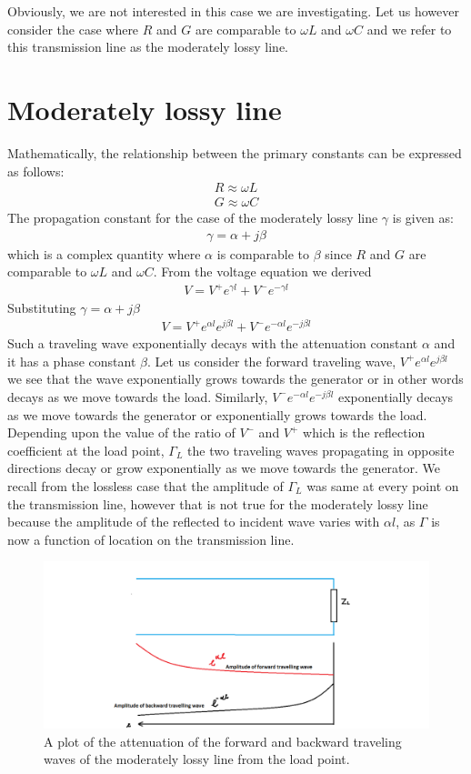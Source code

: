Obviously, we are not interested in this case we are investigating. Let us however consider the case where $R$ and $G$ are comparable to $\omega L$ and $\omega C$ and we refer to this transmission line as the moderately lossy line.
\section{Moderately lossy line}Mathematically, the relationship between the primary constants can be expressed as follows:
\begin{align*}
R \approx \omega L\\
G \approx \omega C
\end{align*}
The propagation constant for the case of the moderately lossy line $\gamma$ is given as:
\begin{align*}
\gamma = \alpha +j\beta
\end{align*}
which is a complex quantity where $\alpha$ is comparable to $\beta$ since $R$ and $G$ are comparable to $\omega L$ and $\omega C$. From the voltage equation we derived
\begin{align*}
V = V^+e^{\gamma l} + V^-e^{
-\gamma l}
\end{align*}
Substituting $\gamma = \alpha + j\beta$
\begin{align*}
V = V^+e^{\alpha l}e^{j\beta l} + V^-e^{-\alpha l}e^{-j\beta l}
\end{align*}
Such a traveling wave exponentially decays with the attenuation constant $\alpha$ and it has a phase constant $\beta$. Let us consider the forward traveling wave, $V^+e^{\alpha l}e^{j\beta l}$ we see that the wave exponentially grows towards the generator or in other words decays as we move towards the load. Similarly, $V^-e^{-\alpha l}e^{-j\beta l}$ exponentially decays as we move towards the generator or exponentially grows towards the load. Depending upon the value of the ratio of $V^-$ and $V^+$ which is the reflection coefficient at the load point, $\Gamma_L$ the two traveling waves propagating in opposite directions decay or grow exponentially as we move towards the generator. We recall from the lossless case that the amplitude of $\Gamma_L$ was same at every point on the transmission line, however that is not true for the moderately lossy line because the amplitude of the reflected to incident wave varies with $\alpha l$, as $\Gamma$ is now a function of location on the transmission line.
\begin{figure}[h]
\centering
\includegraphics[width=1\linewidth]{"./graphics/Standing wave"}
\caption{A plot of the attenuation of the forward and backward traveling waves of the moderately lossy line from the load point.}
\end{figure}

